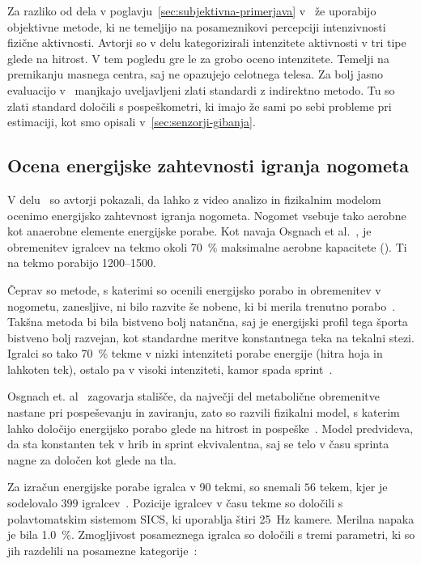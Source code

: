Za razliko od dela v poglavju~\ref{sec:subjektivna-primerjava} v~\cite{silva2015assessing} že uporabijo objektivne metode, ki ne temeljijo na posameznikovi percepciji intenzivnosti fizične aktivnosti. Avtorji so v delu kategorizirali intenzitete aktivnosti v tri tipe glede na hitrost. V tem pogledu gre le za grobo oceno intenzitete. Temelji na premikanju masnega centra, saj ne opazujejo celotnega telesa. Za bolj jasno evaluacijo v~\cite{silva2015assessing} manjkajo uveljavljeni zlati standardi z indirektno metodo. Tu so zlati standard določili s pospeškometri, ki imajo že sami po sebi probleme pri estimaciji, kot smo opisali v~\ref{sec:senzorji-gibanja}.




\subsection{Ocena energijske zahtevnosti igranja nogometa}

V delu~\cite{osgnach2010energy} so avtorji pokazali, da lahko z video analizo in fizikalnim modelom ocenimo energijsko zahtevnost igranja nogometa. Nogomet vsebuje tako aerobne kot anaerobne elemente energijske porabe. Kot navaja Osgnach et al.~\cite{osgnach2010energy}, je obremenitev igralcev na tekmo okoli \SI{70}{\%} maksimalne aerobne kapacitete (\vomax). Ti na tekmo porabijo \SI{1200}{\kcal}--\SI{1500}{\kcal}. 

Čeprav so metode, s katerimi so ocenili energijsko porabo in obremenitev v nogometu, zanesljive, ni bilo razvite še nobene, ki bi merila trenutno porabo~\cite{osgnach2010energy}. Takšna metoda bi bila bistveno bolj natančna, saj je energijski profil tega športa bistveno bolj razvejan, kot standardne meritve konstantnega teka na tekalni stezi. Igralci so tako \SI{70}{\%} tekme v nizki intenziteti porabe energije (hitra hoja in lahkoten tek), ostalo pa v visoki intenziteti, kamor spada sprint~\cite{osgnach2010energy}. 

Osgnach et. al~\cite{osgnach2010energy} zagovarja stališče, da največji del metabolične obremenitve nastane pri pospeševanju in zaviranju, zato so razvili fizikalni model, s katerim lahko določijo energijsko porabo glede na hitrost in pospeške~\cite{osgnach2010energy}. Model predvideva, da sta konstanten tek v hrib in sprint ekvivalentna, saj se telo v času sprinta nagne za določen kot glede na tla.  

Za izračun energijske porabe igralca v \SI{90}{\min} tekmi, so snemali $56$ tekem, kjer je sodelovalo $399$ igralcev~\cite{osgnach2010energy}. Pozicije igralcev v času tekme so določili s polavtomatskim sistemom SICS, ki uporablja štiri \SI{25}{\Hz} kamere. Merilna napaka je bila \SI{1.0}{\%}. Zmogljivost posameznega igralca so določili s tremi parametri, ki so jih razdelili na posamezne kategorije~\cite{osgnach2010energy}:

